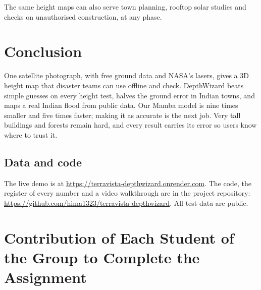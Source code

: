 \documentclass[11pt,a4paper]{article}
\newcommand{\psection}[2]{\section{#1}}
\begin{document}
The same height maps can also serve town planning, rooftop solar studies and checks on unauthorised construction, at any phase.

\psection{Conclusion}{}

One satellite photograph, with free ground data and NASA's lasers, gives a 3D height map that disaster teams can use offline and check. DepthWizard beats simple guesses on every height test, halves the ground error in Indian towns, and maps a real Indian flood from public data. Our Mamba model is nine times smaller and five times faster; making it as accurate is the next job. Very tall buildings and forests remain hard, and every result carries its error so users know where to trust it.

\subsection*{Data and code}
The live demo is at {\small\url{https://terravista-depthwizard.onrender.com}}. The code, the register of every number and a video walkthrough are in the project repository: {\small\url{https://github.com/hima1323/terravista-depthwizard}}. All test data are public.

\psection{Contribution of Each Student of the Group to Complete the Assignment}{}
\label{sec:contrib}
\end{document}
